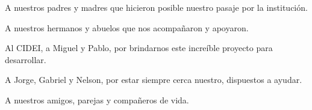 %
%
%

A nuestros padres y madres que hicieron posible nuestro pasaje por la institución.

A nuestros hermanos y abuelos que nos acompañaron y apoyaron.

Al CIDEI, a Miguel y Pablo, por brindarnos este increíble proyecto para desarrollar.

A Jorge, Gabriel y Nelson, por estar siempre cerca nuestro, dispuestos a ayudar. 

A nuestros amigos, parejas y  compañeros de vida.


%

